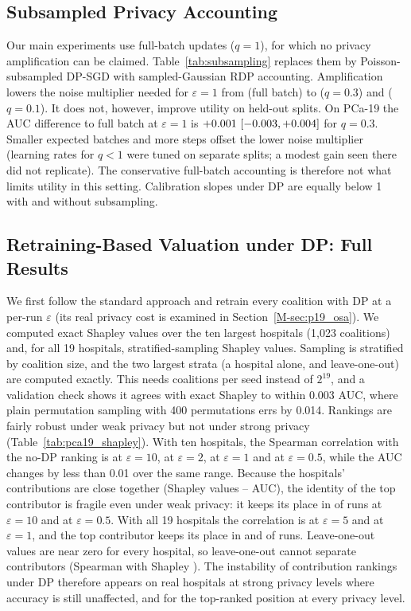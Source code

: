 \subsection{Subsampled Privacy Accounting}
\label{sec:p19_subsampling}
Our main experiments use full-batch updates ($q=1$), for which no privacy amplification can be claimed. Table~\ref{tab:subsampling} replaces them by Poisson-subsampled DP-SGD with sampled-Gaussian RDP accounting. Amplification lowers the noise multiplier needed for $\varepsilon=1$ from \ssSigFull{} (full batch) to \ssSigThree{} ($q=0.3$) and \ssSigOne{} ($q=0.1$). It does not, however, improve utility on held-out splits. On PCa-19 the AUC difference to full batch at $\varepsilon=1$ is $+0.001\ [-0.003, +0.004]$ for $q=0.3$. Smaller expected batches and more steps offset the lower noise multiplier (learning rates for $q<1$ were tuned on separate splits; a modest gain seen there did not replicate). The conservative full-batch accounting is therefore not what limits utility in this setting. Calibration slopes under DP are equally below 1 with and without subsampling.




\subsection{Retraining-Based Valuation under DP: Full Results}
\label{sec:retrain_full}
We first follow the standard approach and retrain every coalition with DP at a per-run $\varepsilon$ (its real privacy cost is examined in Section~\ref{M-sec:p19_osa}). We computed exact Shapley values over the ten largest hospitals (1{,}023 coalitions) and, for all 19 hospitals, stratified-sampling Shapley values. Sampling is stratified by coalition size, and the two largest strata (a hospital alone, and leave-one-out) are computed exactly. This needs \pShNineCoal{} coalitions per seed instead of $2^{19}$, and a validation check shows it agrees with exact Shapley to within 0.003 AUC, where plain permutation sampling with 400 permutations errs by 0.014. Rankings are fairly robust under weak privacy but not under strong privacy (Table~\ref{tab:pca19_shapley}). With ten hospitals, the Spearman correlation with the no-DP ranking is \pShRhoTen{} at $\varepsilon=10$, \pShRhoTwo{} at $\varepsilon=2$, \pShRhoOne{} at $\varepsilon=1$ and \pShRhoHalf{} at $\varepsilon=0.5$, while the AUC changes by less than 0.01 over the same range. Because the hospitals' contributions are close together (Shapley values \pShPhiMin--\pShPhiMax{} AUC), the identity of the top contributor is fragile even under weak privacy: it keeps its place in \pShTSTen{} of runs at $\varepsilon=10$ and \pShTSHalf{} at $\varepsilon=0.5$. With all 19 hospitals the correlation is \pShNineRhoFive{} at $\varepsilon=5$ and \pShNineRhoOne{} at $\varepsilon=1$, and the top contributor keeps its place in \pShNineTSFive{} and \pShNineTSOne{} of runs. Leave-one-out values are near zero for every hospital, so leave-one-out cannot separate contributors (Spearman with Shapley \pShLooRho). The instability of contribution rankings under DP therefore appears on real hospitals at strong privacy levels where accuracy is still unaffected, and for the top-ranked position at every privacy level.




